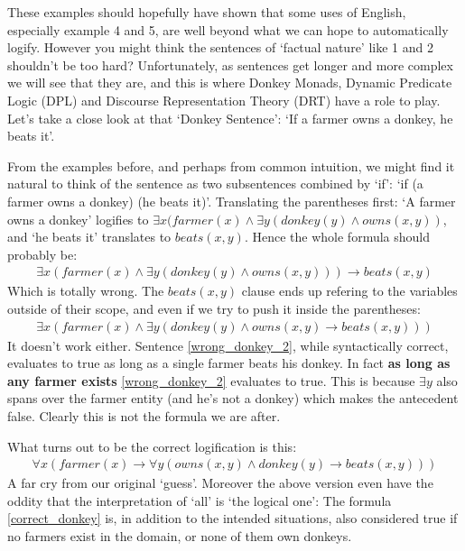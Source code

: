 \documentclass[12pt]{article}
\begin{document}
These examples should hopefully have shown that some uses of English, especially example 4 and 5, are well beyond what we can hope to automatically logify. However you might think the sentences of `factual nature' like 1 and 2 shouldn't be too hard? Unfortunately, as sentences get longer and more complex we will see that they are, and this is where Donkey Monads, Dynamic Predicate Logic (DPL) and Discourse Representation Theory (DRT) have a role to play. Let's take a close look at that `Donkey Sentence': `If a farmer owns a donkey, he beats it'.

From the examples before, and perhaps from common intuition, we might find it natural to think of the sentence as two subsentences combined by `if': `if (a farmer owns a donkey) (he beats it)'. Translating the parentheses first: `A farmer owns a donkey' logifies to $\exists x (farmer(x) \wedge \exists y (donkey(y)\wedge owns(x,y))$, and `he beats it' translates to $beats(x,y)$. Hence the whole formula should probably be:
%
\begin{align}
\exists x (farmer(x) \wedge \exists y (donkey(y)\wedge owns(x,y))) \rightarrow beats(x,y)
\end{align}
%
Which is totally wrong. The $beats(x,y)$ clause ends up refering to the variables outside of their scope, and even if we try to push it inside the parentheses:
%
\begin{align}
\exists x (farmer(x) \wedge \exists y (donkey(y)\wedge owns(x,y) \rightarrow beats(x,y))) \label{wrong_donkey_2}
\end{align}
%
It doesn't work either. Sentence \eqref{wrong_donkey_2}, while syntactically correct, evaluates to true as long as a single farmer beats his donkey. In fact \textbf{as long as any farmer exists} \eqref{wrong_donkey_2} evaluates to true. This is because $\exists y$ also spans over the farmer entity (and he's not a donkey) which makes the antecedent false. Clearly this is not the formula we are after.

What turns out to be the correct logification is this:
%
\begin{align}
\forall x (farmer(x) \rightarrow \forall y (owns(x,y) \wedge donkey(y) \rightarrow beats(x,y))) \label{correct_donkey}
\end{align}
%
A far cry from our original `guess'. Moreover the above version even have the oddity that the interpretation of `all' is `the logical one': The formula \eqref{correct_donkey} is, in addition to the intended situations, also considered true if no farmers exist in the domain, or none of them own donkeys.
\end{document}
